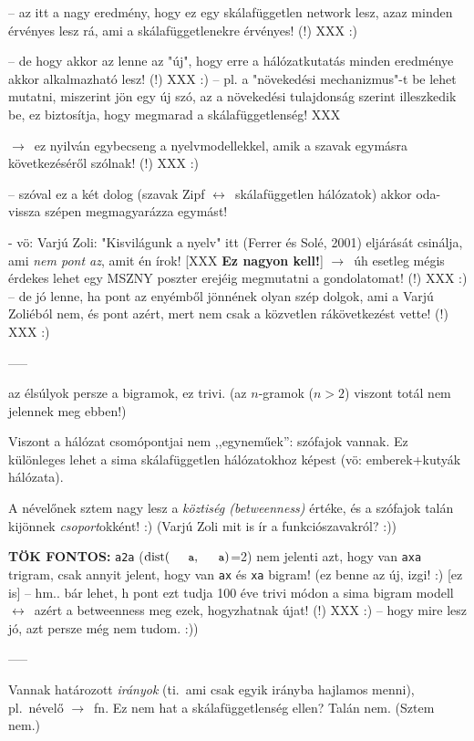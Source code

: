 \documentclass{llncs}
\newcommand{\nyil}{$\rightarrow$\ }
\newcommand{\nnyil}{$\leftrightarrow$\ }
\newcommand{\code}[1]{\texttt{\small #1}}
\newcommand{\embf}[1]{\textbf{#1}}
\newcommand{\path}[1]{\code{#1}}
\DeclareMathOperator{\distop}{dist}
\newcommand{\dist}[2]{\ensuremath{\distop(\path{#1},\path{#2})}}
\newcommand{\XXX}[1]{{\small \color{megjcolor} [XXX #1]}}
\newcommand{\XXXb}[1]{\XXX{\embf{#1}}}
\newcommand{\smp}[1]{{\small (#1)}}
\begin{document}
 -- az itt a nagy eredmény, hogy ez egy skálafüggetlen network lesz, azaz
    minden érvényes lesz rá, ami a skálafüggetlenekre érvényes! (!) XXX :)

 -- de hogy akkor az lenne az "új", hogy erre a hálózatkutatás
    minden eredménye akkor alkalmazható lesz! (!) XXX :)
    -- pl. a "növekedési mechanizmus"-t be lehet mutatni,
       miszerint jön egy új szó, az a növekedési tulajdonság szerint
       illeszkedik be, ez biztosítja, hogy megmarad a skálafüggetlenség! XXX

 \nyil ez nyilván egybecseng a nyelvmodellekkel,
    amik a szavak egymásra következéséről szólnak! (!) XXX :)

 -- szóval ez a két dolog (szavak Zipf \nnyil skálafüggetlen hálózatok)
    akkor oda-vissza szépen megmagyarázza egymást!

 - vö: Varjú Zoli: "Kisvilágunk a nyelv"
   itt (Ferrer és Solé, 2001) eljárását csinálja,
   ami  \emph{nem pont az}, amit én írok! \XXXb{Ez nagyon kell!}
   \nyil úh esetleg mégis érdekes lehet
      egy MSZNY poszter erejéig megmutatni a gondolatomat! (!) XXX :)
   -- de jó lenne, ha pont az enyémből jönnének olyan szép dolgok,
      ami a Varjú Zoliéból nem, és pont azért, mert
      nem csak a közvetlen rákövetkezést vette! (!) XXX :)

-----

az élsúlyok persze a bigramok, ez trivi.
\smp{az $n$-gramok ($n > 2$) viszont totál nem jelennek meg ebben!}

Viszont a hálózat csomópontjai nem ,,egyneműek'': szófajok vannak.
Ez különleges lehet a sima skálafüggetlen hálózatokhoz képest
(vö: emberek+kutyák hálózata).

A névelőnek sztem nagy lesz a \emph{köztiség (betweenness)} értéke,
és a szófajok talán kijönnek \emph{csoport}okként! :)
\smp{Varjú Zoli mit is ír a funkciószavakról? :)}

\embf{TÖK FONTOS:}
\path{a2a} (\dist{a}{a}=2) nem jelenti azt, hogy van \path{axa} trigram,
csak annyit jelent, hogy van \path{ax} és \path{xa} bigram!
\smp{ez benne az új, izgi! :) [ez is]
-- hm.. bár lehet, h pont ezt tudja
   100 éve trivi módon a sima bigram modell
   \nnyil azért a betweenness meg ezek, hogyzhatnak újat! (!) XXX :)
-- hogy mire lesz jó, azt persze még nem tudom. :)}

-----

Vannak határozott \emph{irányok}
(ti.\ ami csak egyik irányba hajlamos menni), pl.\ névelő \nyil fn.  
Ez nem hat a skálafüggetlenség ellen? Talán nem. (Sztem nem.)
\end{document}
